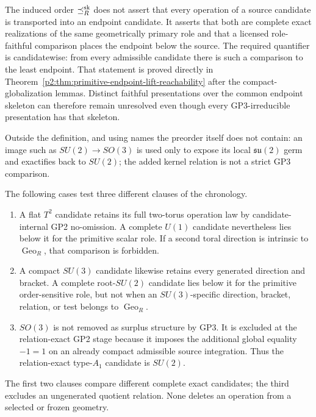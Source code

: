 \documentclass[12pt,a4paper]{article}
\begin{document}
\begin{remark}
\label{p2:rem:primitive-endpoint-reachability-scope}
The induced order \(\preceq_R^{\rm sk}\) does not assert that every operation
of a source candidate is transported into an endpoint candidate.  It asserts
that both are complete exact realizations of the same geometrically primary
role and that a licensed role-faithful comparison places the endpoint below
the source.  The required quantifier is candidatewise: from every admissible
candidate there is such a comparison to the least endpoint.  That statement is
proved directly in
Theorem~\ref{p2:thm:primitive-endpoint-lift-reachability} after the
compact-globalization lemmas.  Distinct faithful presentations over the common
endpoint skeleton can therefore remain unresolved even though every
GP3-irreducible presentation has that skeleton.
\end{remark}

\begin{remark}
\label{p2:rem:exactification-illustration}
Outside the definition, and using names the preorder itself does not contain:
an image such as \(SU(2)\to SO(3)\) is used only to expose its local
\(\mathfrak{su}(2)\) germ and exactifies back to \(SU(2)\); the added kernel
relation is not a strict GP3 comparison.
\end{remark}

\begin{remark}
\label{p2:rem:three-candidate-chronology-controls}
The following cases test three different clauses of the chronology.
\begin{enumerate}[label=(\roman*),leftmargin=2em]
\item A flat \(T^2\) candidate retains its full two-torus operation law by
candidate-internal GP2 no-omission.  A complete \(U(1)\) candidate nevertheless
lies below it for the primitive scalar role.  If a second toral direction is
intrinsic to \(\operatorname{Geo}_R\), that comparison is forbidden.
\item A compact \(SU(3)\) candidate likewise retains every generated direction
and bracket.  A complete root-\(SU(2)\) candidate lies below it for the
primitive order-sensitive role, but not when an \(SU(3)\)-specific direction,
bracket, relation, or test belongs to \(\operatorname{Geo}_R\).
\item \(SO(3)\) is not removed as surplus structure by GP3.  It is excluded at
the relation-exact GP2 stage because it imposes the additional global equality
\(-1=1\) on an already compact admissible source integration.  Thus the
relation-exact type-\(A_1\) candidate is \(SU(2)\).
\end{enumerate}
The first two clauses compare different complete exact candidates; the third
excludes an ungenerated quotient relation.  None deletes an operation from a
selected or frozen geometry.
\end{remark}
\end{document}
